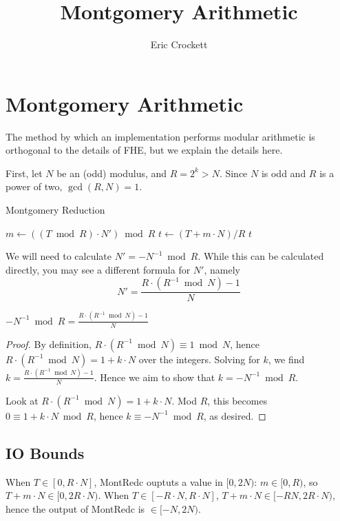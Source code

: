 \documentclass[../fheimpl.tex]{subfiles}
\title{Montgomery Arithmetic}
\author{Eric Crockett}
\begin{document}
\ifcompileasbook
\else
\maketitle
\listoffixmes
\fi

\section{Montgomery Arithmetic}
The method by which an implementation performs modular arithmetic is orthogonal to the details of FHE, but we explain the details here.

First, let $N$ be an (odd) modulus, and $R=2^k>N$. Since $N$ is odd and $R$ is a power of two, $\gcd(R,N)=1$.

\begin{algorithm}
    \caption{Montgomery Reduction}\label{alg:mont_redc_simple}
    \begin{algorithmic}[1]
            \State $m\gets ((T\bmod R)\cdot N')\bmod R$
            \State $t\gets (T+m\cdot N)/R$
            \State \Return $t$
        \EndProcedure
    \end{algorithmic}
\end{algorithm}

We will need to calculate $N'=-N^{-1} \bmod R$. While this can be calculated directly, you may see a different formula for $N'$, namely
\[N' = \frac{R\cdot (R^{-1}\bmod N) - 1}{N}\]

\begin{lemma}
	$-N^{-1} \bmod R = \frac{R\cdot (R^{-1}\bmod N) - 1}{N}$
\end{lemma}
\begin{proof}
	By definition, $R\cdot (R^{-1}\bmod N) \equiv 1\bmod N$, hence $R\cdot (R^{-1}\bmod N) = 1 + k\cdot N$ over the integers. Solving for $k$, we find $k=\frac{R\cdot (R^{-1}\bmod N) - 1}{N}$. Hence we aim to show that $k=-N^{-1} \bmod R$. 
	
	Look at $R\cdot (R^{-1}\bmod N) = 1 + k\cdot N$. Mod $R$, this becomes $0\equiv 1+k\cdot N\bmod R$, hence $k\equiv -N^{-1}\bmod R$, as desired.
\end{proof}

\subsection{IO Bounds}
When $T\in[0, R\cdot N]$, \textsf{MontRedc} ouptuts a value in $[0, 2N)$: $m\in[0, R)$, so $T+m\cdot N\in [0, 2R\cdot N)$.
When $T\in[-R\cdot N, R\cdot N]$, $T+m\cdot N\in [-RN, 2R\cdot N)$, hence the output of \textsf{MontRedc} is $\in [-N, 2N)$.
\end{document}
